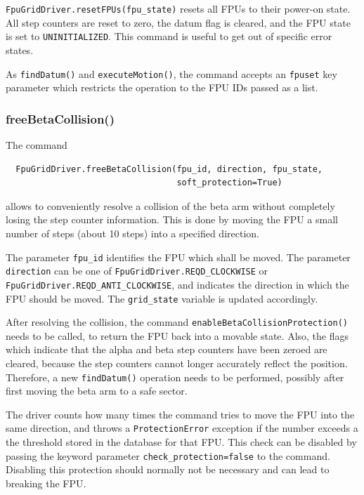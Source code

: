 \documentclass[11pt,a4paper]{scrartcl}
\begin{document}
\texttt{FpuGridDriver.resetFPUs(fpu\_state)} resets all FPUs to their
power-on state. All step counters are reset to zero, the datum flag is
cleared, and the FPU state is set to \texttt{UNINITIALIZED}. This
command is useful to get out of specific error states. 

As \texttt{findDatum()} and \texttt{executeMotion()}, the command
accepts an \texttt{fpuset} key parameter which restricts the operation
to the FPU IDs passed as a list.

\subsubsection{freeBetaCollision()}

The command
\begin{verbatim}
  FpuGridDriver.freeBetaCollision(fpu_id, direction, fpu_state,
                                  soft_protection=True)
\end{verbatim}
allows to conveniently resolve a collision
of the beta arm without completely losing the step counter
information. This is done by moving the FPU a small number of steps
(about 10 steps) into a specified direction.

\begin{sloppypar}
The parameter \texttt{fpu\_id} identifies the FPU which shall be
moved. The parameter \texttt{direction} can be one of
\texttt{FpuGridDriver.REQD\_CLOCKWISE} or
\texttt{FpuGridDriver.REQD\_ANTI\_CLOCKWISE}, and indicates the
direction in which the FPU should be moved. The \texttt{grid\_state}
variable is updated accordingly.
\end{sloppypar}

After resolving the collision, the command
\texttt{enableBetaCollisionProtection()} needs to be called, to return
the FPU back into a movable state.  Also, the flags which indicate
that the alpha and beta step counters have been zeroed are cleared,
because the step counters cannot longer accurately reflect the
position. Therefore, a new \texttt{findDatum()} operation needs to be
performed, possibly after first moving the beta arm to a safe sector.

The driver counts how many times the command tries to move the FPU
into the same direction, and throws a \texttt{ProtectionError}
exception if the number exceeds a the threshold stored in the database
for that FPU. This check can be disabled by passing the keyword
parameter \texttt{check\_protection=false} to the command. Disabling
this protection should normally not be necessary and can lead to
breaking the FPU.
\end{document}
